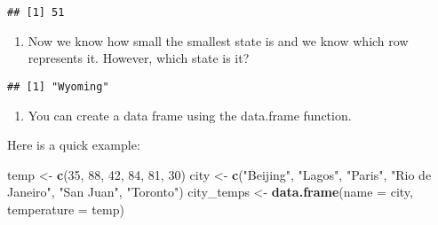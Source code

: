 \documentclass[
]{article}
\newenvironment{Shaded}{\begin{snugshade}}{\end{snugshade}}
\newcommand{\CommentTok}[1]{\textcolor[rgb]{0.56,0.35,0.01}{\textit{#1}}}
\newcommand{\DataTypeTok}[1]{\textcolor[rgb]{0.13,0.29,0.53}{#1}}
\newcommand{\DecValTok}[1]{\textcolor[rgb]{0.00,0.00,0.81}{#1}}
\newcommand{\KeywordTok}[1]{\textcolor[rgb]{0.13,0.29,0.53}{\textbf{#1}}}
\newcommand{\NormalTok}[1]{#1}
\newcommand{\OperatorTok}[1]{\textcolor[rgb]{0.81,0.36,0.00}{\textbf{#1}}}
\newcommand{\StringTok}[1]{\textcolor[rgb]{0.31,0.60,0.02}{#1}}
\providecommand{\tightlist}{%
  \setlength{\itemsep}{0pt}\setlength{\parskip}{0pt}}
\begin{document}
\begin{verbatim}
## [1] 51
\end{verbatim}

\begin{enumerate}
\def\labelenumi{\arabic{enumi}.}
\setcounter{enumi}{3}
\tightlist
\item
  Now we know how small the smallest state is and we know which row
  represents it. However, which state is it?
\end{enumerate}

\begin{Shaded}
\end{Shaded}

\begin{verbatim}
## [1] "Wyoming"
\end{verbatim}

\begin{enumerate}
\def\labelenumi{\arabic{enumi}.}
\setcounter{enumi}{4}
\tightlist
\item
  You can create a data frame using the data.frame function.
\end{enumerate}

Here is a quick example:

\begin{Shaded}
\begin{Highlighting}[]
\NormalTok{temp <-}\StringTok{ }\KeywordTok{c}\NormalTok{(}\DecValTok{35}\NormalTok{, }\DecValTok{88}\NormalTok{, }\DecValTok{42}\NormalTok{, }\DecValTok{84}\NormalTok{, }\DecValTok{81}\NormalTok{, }\DecValTok{30}\NormalTok{)}
\NormalTok{city <-}\StringTok{ }\KeywordTok{c}\NormalTok{(}\StringTok{"Beijing"}\NormalTok{, }\StringTok{"Lagos"}\NormalTok{, }\StringTok{"Paris"}\NormalTok{, }\StringTok{"Rio de Janeiro"}\NormalTok{, }\StringTok{"San Juan"}\NormalTok{, }\StringTok{"Toronto"}\NormalTok{)}
\NormalTok{city_temps <-}\StringTok{ }\KeywordTok{data.frame}\NormalTok{(}\DataTypeTok{name =}\NormalTok{ city, }\DataTypeTok{temperature =}\NormalTok{ temp)}
\end{Highlighting}
\end{Shaded}
\end{document}
